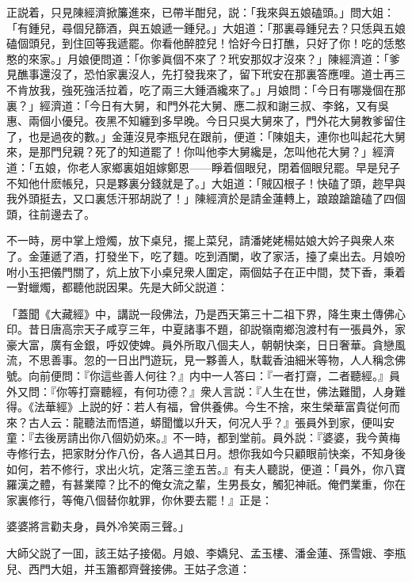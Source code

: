 正説着，只見陳經濟掀簾進來，已帶半酣兒，説：「我來與五娘磕頭。」問大姐：「有鍾兒，尋個兒篩酒，與五娘遞一鍾兒。」大姐道：「那裏尋鍾兒去？只恁與五娘磕個頭兒，到住回等我遞罷。你看他醉腔兒！恰好今日打醮，只好了你！吃的恁憨憨的來家。」月娘便問道：「你爹眞個不來了？玳安那奴才沒來？」陳經濟道：「爹見醮事還沒了，恐怕家裏沒人，先打發我來了，留下玳安在那裏答應哩。道士再三不肯放我，強死強活拉着，吃了兩三大鍾酒纔來了。」月娘問：「今日有哪幾個在那裏？」經濟道：「今日有大舅，和門外花大舅、應二叔和謝三叔、李銘，又有吳惠、兩個小優兒。夜黑不知纏到多早晚。今日只吳大舅來了，門外花大舅教爹留住了，也是過夜的數。」金蓮沒見李瓶兒在跟前，便道：「陳姐夫，連你也叫起花大舅來，是那門兒親？死了的知道罷了！你叫他李大舅纔是，怎叫他花大舅？」經濟道：「五娘，你老人家鄉裏姐姐嫁鄭恩——睜着個眼兒，閉着個眼兒罷。早是兒子不知他什麽帳兒，只是夥裏分錢就是了。」大姐道：「賊囚根子！快磕了頭，趂早與我外頭挺去，又口裏恁汗邪胡説了！」陳經濟於是請金蓮轉上，踉踉蹌蹌磕了四個頭，往前邊去了。

不一時，房中掌上燈燭，放下桌兒，擺上菜兒，請潘姥姥楊姑娘大妗子與衆人來了。金蓮遞了酒，打發坐下，吃了麵。吃到酒闌，收了家活，擡了桌出去。月娘吩咐小玉把儀門關了，炕上放下小桌兒衆人圍定，兩個姑子在正中間，焚下香，秉着一對蠟燭，都聽他説因果。先是大師父説道：

\begin{myquote}[\markfont]
「蓋聞《大藏經》中，講説一段佛法，乃是西天第三十二祖下界，降生東土傳佛心印。昔日唐高宗天子咸亨三年，中夏諸事不題，卻説嶺南鄉泡渡村有一張員外，家豪大富，廣有金銀，呼奴使婢。員外所取八個夫人，朝朝快楽，日日奢華。貪戀風流，不思善事。忽的一日出門遊玩，見一夥善人，馱載香油細米等物，人人稱念佛號。向前便問：『你這些善人何往？』内中一人答曰：『一者打齋，二者聽經。』員外又問：『你等打齋聽經，有何功德？』衆人言説：『人生在世，佛法難聞，人身難得。《法華經》上説的好：若人有福，曾供養佛。今生不捨，來生榮華富貴従何而來？古人云：龍聽法而悟道，蟒聞懺以升天，何况人乎？』張員外到家，便叫安童：『去後房請出你八個奶奶來。』不一時，都到堂前。員外説：『婆婆，我今黄梅寺修行去，把家財分作八份，各人過其日月。想你我如今只顧眼前快楽，不知身後如何，若不修行，求出火坑，定落三塗五苦。』有夫人聽説，便道：「員外，你八寶羅漢之體，有甚業障？比不的俺女流之輩，生男長女，觸犯神祇。俺們業重，你在家裏修行，等俺八個替你躭罪，你休要去罷！』正是：

婆婆將言勸夫身，員外冷笑兩三聲。」
\end{myquote}

大師父説了一囬，該王姑子接偈。月娘、李嬌兒、孟玉樓、潘金蓮、孫雪娥、李瓶兒、西門大姐，并玉簫都齊聲接佛。王姑子念道：

